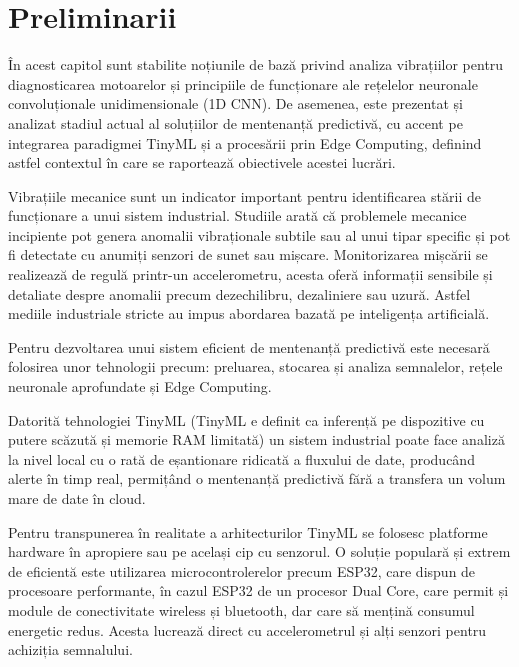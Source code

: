 \chapter{Preliminarii}

	În acest capitol sunt stabilite noțiunile de bază privind analiza vibrațiilor pentru diagnosticarea motoarelor și principiile de funcționare ale rețelelor neuronale convoluționale unidimensionale (1D CNN). De asemenea, este prezentat și analizat stadiul actual al soluțiilor de mentenanță predictivă, cu accent pe integrarea paradigmei TinyML și a procesării prin Edge Computing, definind astfel contextul în care se raportează obiectivele acestei lucrări.
	
	Vibrațiile mecanice sunt un indicator important pentru identificarea stării de funcționare a unui sistem industrial. \cite{wowk1991machinery} Studiile arată că problemele mecanice incipiente pot genera anomalii vibraționale subtile  sau al unui tipar specific și pot fi detectate cu anumiți senzori de sunet sau mișcare. \cite{vitolo2022low, kolok2025low, bala2024artificial, garcia2025condition} Monitorizarea mișcării se realizează de regulă printr-un accelerometru, acesta oferă informații sensibile și detaliate despre  anomalii precum dezechilibru, dezaliniere sau uzură. \cite{gupta2025embedded} Astfel mediile industriale stricte au impus abordarea bazată pe inteligența artificială. \cite{vitolo2022low}
	
	Pentru dezvoltarea unui sistem eficient de mentenanță predictivă este necesară folosirea unor tehnologii precum: preluarea, stocarea și analiza semnalelor, rețele neuronale aprofundate și Edge Computing.
	
	Datorită tehnologiei TinyML (TinyML e definit ca inferență pe dispozitive cu putere scăzută și memorie RAM limitată) un sistem industrial poate face analiză la nivel local cu o rată de eșantionare ridicată a fluxului de date, producând alerte în timp real, permițând o mentenanță predictivă fără a transfera un volum mare de date în cloud. \cite{gupta2025embedded}
	
	Pentru transpunerea în realitate a arhitecturilor TinyML se folosesc platforme hardware în apropiere sau pe același cip cu senzorul. O soluție populară și extrem de eficientă este utilizarea microcontrolerelor precum ESP32, care dispun de procesoare performante, în cazul ESP32 de un procesor Dual Core, care permit și module de conectivitate wireless și bluetooth, dar care să mențină consumul energetic redus. \cite{vitolo2022low, gupta2025embedded} Acesta lucrează direct cu accelerometrul și alți senzori pentru achiziția semnalului. \cite{gupta2025embedded}
	
